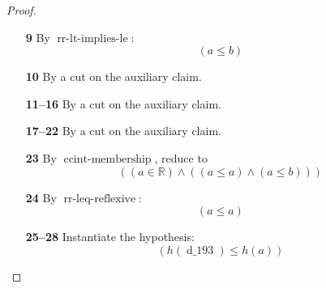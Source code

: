\documentclass[11pt]{article}
\theoremstyle{plain}
\begin{document}
\begin{proof}
\begin{itemize}[leftmargin=2.8em, itemsep=4pt, parsep=1pt]
  \item[\textbf{9}] By $\operatorname{rr\text{-}lt\text{-}implies\text{-}le}$:
\begin{equation*}
(a \leq b)
\end{equation*}

  \item[\textbf{10}] By a cut on the auxiliary claim.
  \item[\textbf{11--16}] By a cut on the auxiliary claim.
  \item[\textbf{17--22}] By a cut on the auxiliary claim.
  \item[\textbf{23}] By $\operatorname{ccint\text{-}membership}$, reduce to
\begin{equation*}
((a \in \mathbb{R}) \wedge ((a \leq a) \wedge (a \leq b)))
\end{equation*}

  \item[\textbf{24}] By $\operatorname{rr\text{-}leq\text{-}reflexive}$:
\begin{equation*}
(a \leq a)
\end{equation*}

  \item[\textbf{25--28}] Instantiate the hypothesis:
\begin{equation*}
(h(\operatorname{d\_193}) \leq h(a))
\end{equation*}


\end{itemize}
\end{proof}
\end{document}
